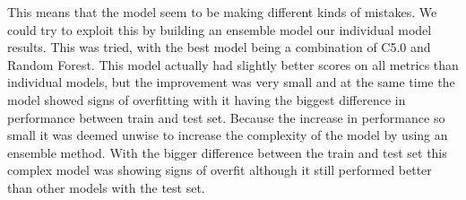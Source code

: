 \documentclass[12pt,a4paper,leqno]{report}
\theoremstyle{plain}
\theoremstyle{definition}
\theoremstyle{remark}
\begin{document}
This means that the model seem to be making different kinds of mistakes.
We could try to exploit this by building an ensemble model our individual model results.
This was tried, with the best model being a combination of C5.0 and
Random Forest. This model actually had slightly better scores on all metrics
than individual models, but the improvement was very small and at the same
time the model showed signs of overfitting with it having the biggest difference
in performance between train and test set. Because the increase in performance so small
it was deemed unwise to increase the complexity of the model by using an ensemble method.
With the bigger difference between the train and test set this complex model was showing
signs of overfit although it still performed better than other models with the test set.
\end{document}
